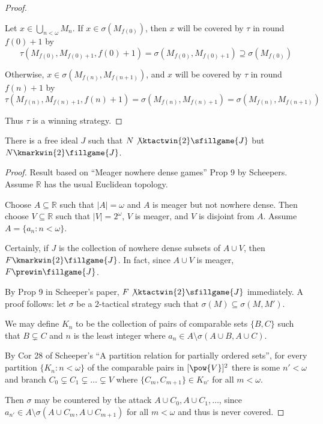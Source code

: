 \begin{proof}
\begin{itemize}
          Let $x \in \bigcup_{n<\omega}M_n$. If $x\in\sigma(M_{f(0)})$, then $x$ will be covered by $\tau$ in round $f(0)+1$ by
            \[
              \tau(M_{f(0)},M_{f(0)+1},f(0)+1)
              = \sigma(M_{f(0)},M_{f(0)+1})
              \supseteq \sigma(M_{f(0)})
            \]

          Otherwise, $x\in\sigma(M_{f(n)},M_{f(n+1)})$, and $x$ will be covered by $\tau$ in round $f(n)+1$ by
            \[
              \tau(M_{f(n)},M_{f(n)+1},f(n)+1)
              = \sigma(M_{f(n)},M_{f(n)+1})
              = \sigma(M_{f(n)},M_{f(n+1)})
            \]
      \end{itemize}

      Thus $\tau$ is a winning strategy.
  \end{proof}

  \begin{ex}
    There is a free ideal $J$ such that $N\not\ktactwin{2}\sfillgame{J}$ but $N\kmarkwin{2}\fillgame{J}$.
  \end{ex}

  \begin{proof}
    Result based on ``Meager nowhere dense games'' Prop 9 by Scheepers. Assume $\mathbb{R}$ has the usual Euclidean topology.

    Choose $A\subseteq\mathbb{R}$ such that $|A|=\omega$ and $A$ is meager but not nowhere dense. Then choose $V\subseteq\mathbb{R}$ such that $|V|=2^\omega$, $V$ is meager, and $V$ is disjoint from $A$. Assume $A=\{a_n:n<\omega\}$.

    Certainly, if $J$ is the collection of nowhere dense subsets of $A\cup V$, then $F\kmarkwin{2}\fillgame{J}$. In fact, since $A\cup V$ is meager, $F\prewin\fillgame{J}$. 

    By Prop 9 in Scheeper's paper, $F\not\ktactwin{2}\sfillgame{J}$ immediately. A proof follows: let $\sigma$ be a $2$-tactical strategy such that $\sigma(M)\subseteq\sigma(M,M')$.

    We may define $K_n$ to be the collection of pairs of comparable sets $\{B,C\}$ such that $B\subsetneq C$ and $n$ is the least integer where $a_n \in A \setminus \sigma(A\cup B,A\cup C)$.

    By Cor 28 of Scheeper's ``A partition relation for partially ordered sets'', for every partition $\{K_n:n<\omega\}$ of the comparable pairs in $[\pow{V}]^2$ there is some $n'<\omega$ and branch $C_0\subsetneq C_1\subsetneq \dots\subsetneq V$ where $\{C_m,C_{m+1}\}\in K_{n'}$ for all $m<\omega$.

    Then $\sigma$ may be countered by the attack $A\cup C_0, A\cup C_1, \dots$, since $a_{n'} \in A \setminus \sigma(A\cup C_m,A\cup C_{m+1})$ for all $m<\omega$ and thus is never covered.
  \end{proof}

















